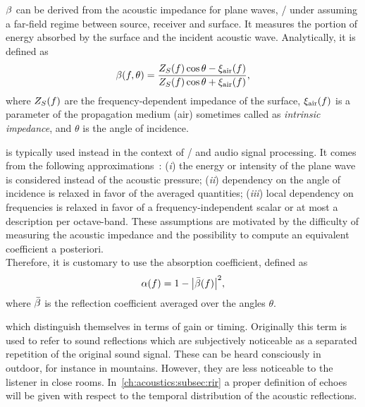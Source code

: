  $\beta$ can be derived from the acoustic impedance
for plane waves, \ie/ under assuming a far-field regime between source, receiver and surface.
It measures the portion of energy absorbed by the surface and the incident acoustic wave.
Analytically, it is defined as  
\begin{equation}
    \beta(f, \theta) = \frac{Z_{S}(f)\cos{\theta} - \xi_\text{air}(f)}{Z_{S}(f)\cos{\theta} + \xi_\text{air}(f)}
    ,
\end{equation}
where $Z_{S}(f)$ are the frequency-dependent impedance of the surface, $\xi_\text{air}(f)$ is a parameter of the propagation medium (air)
sometimes called as \textit{intrinsic impedance}, and $\theta$ is the angle of incidence.

 is typically used instead in the context of \GA/ and audio signal processing.
It comes from the following approximations~:
(\textit{i}) the energy or intensity of the plane wave is considered instead of the acoustic pressure;
(\textit{ii}) dependency on the angle of incidence is relaxed in favor of the averaged quantities;
(\textit{iii}) local dependency on frequencies is relaxed in favor of a frequency-independent scalar or at most a description per octave-band.
These assumptions are motivated by the difficulty of measuring the acoustic impedance
and the possibility to compute an equivalent coefficient a posteriori.
\\Therefore, it is customary to use the absorption coefficient, defined as
\begin{equation}
    \absCoeff(f) = 1 - \abs{\bar{\reflCoeff}(f)}^2
    ,
\end{equation}
where $\bar{\beta}$ is the reflection coefficient averaged over the angles $\theta$.

 which  distinguish themselves in terms of gain or timing.
Originally this term is used to refer to sound reflections which are subjectively noticeable as a separated repetition of the original sound signal.
These can be heard consciously in outdoor, for instance in mountains. However, they are less noticeable to the listener in close rooms.
In~\cref{ch:acoustics:subsec:rir} a proper definition of echoes will be given with respect to the temporal distribution of the acoustic reflections.

